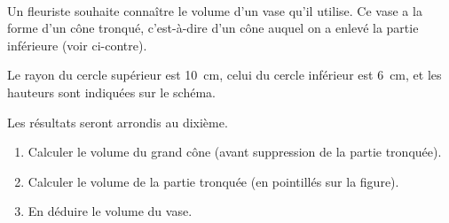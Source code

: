 \documentclass[12pt]{article}
\begin{document}
\begin{exercice}~
  \begin{multicols}{2}
    Un fleuriste souhaite connaître le volume d'un vase qu'il utilise. Ce vase a la forme d'un cône tronqué, c'est-à-dire d'un cône auquel on a enlevé la partie inférieure (voir ci-contre).

    Le rayon du cercle supérieur est 10~cm, celui du cercle inférieur est 6~cm, et les hauteurs sont indiquées sur le schéma.

    \columnbreak

    \begin{center}
    \end{center}
  \end{multicols}

  Les résultats seront arrondis au dixième.
  \begin{enumerate}[(1)]
    \item Calculer le volume du grand cône (avant suppression de la partie tronquée).
    \item Calculer le volume de la partie tronquée (en pointillés sur la figure).
    \item En déduire le volume du vase.
  \end{enumerate}

\end{exercice}
\end{document}
